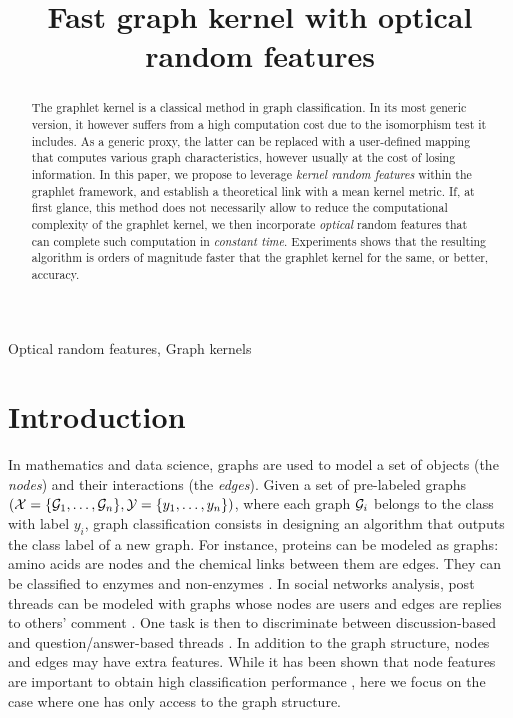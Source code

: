 \documentclass{article}
\title{Fast graph kernel with optical random features}
\begin{document}
%
\newtheorem{theorem}{Theorem} 
\maketitle
%
\begin{abstract}
The graphlet kernel is a classical method in graph classification. In its most generic version, it however suffers from a high computation cost due to the isomorphism test it includes. As a generic proxy, the latter can be replaced with a user-defined mapping that computes various graph characteristics, however usually at the cost of losing information. In this paper, we propose to leverage \emph{kernel random features} within the graphlet framework, and establish a theoretical link with a mean kernel metric. If, at first glance, this method does not necessarily allow to reduce the computational complexity of the graphlet kernel, we then incorporate \emph{optical} random features that can complete such computation in \emph{constant time}. Experiments shows that the resulting algorithm is orders of magnitude faster that the graphlet kernel for the same, or better, accuracy.
\end{abstract}
%
\begin{keywords}
Optical random features, Graph kernels
\end{keywords}
%
\section{Introduction}
\label{sec:intro}
In mathematics and data science, graphs are used to model a set of objects (the \emph{nodes}) and their interactions (the \emph{edges}). %
Given a set of pre-labeled graphs $(\mathcal{X}=\{\mathcal{G}_1,\ldots,\mathcal{G}_n\}, \mathcal{Y}=\{y_1,\ldots,y_n\})$, where each graph $\mathcal{G}_i$ belongs to the class with label $y_i$, graph classification consists in designing an algorithm that outputs the class label of a new graph.
%
For instance, proteins can be modeled as graphs: amino acids are nodes and the chemical links between them are edges. They can be classified to enzymes and non-enzymes \cite{protein_application}.
%
In social networks analysis, post threads can be modeled with graphs whose nodes are users and edges are replies to others' comment \cite{graph_soc_net}. One task is then to discriminate between discussion-based and question/answer-based threads \cite{class_Reddit}.
%
In addition to the graph structure, nodes and edges may have extra features. While it has been shown that node features are important to obtain high classification performance \cite{node_features}, here we focus on the case where one has only access to the graph structure.%
\end{document}
